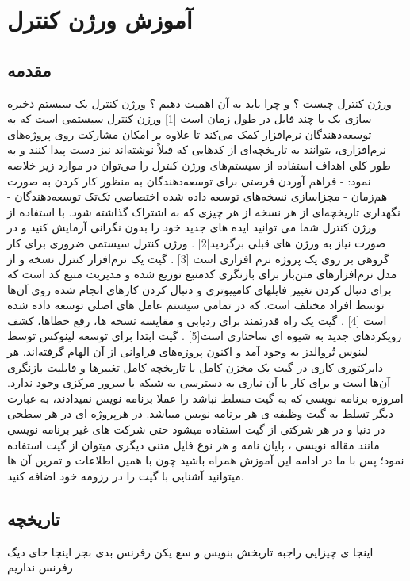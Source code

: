 \chapter{آموزش ورژن کنترل}




\section{مقدمه}
ورژن کنترل چیست ؟ و چرا باید به آن اهمیت دهیم ؟ ورژن کنترل یک سیستم ذخیره سازی یک یا چند فایل در طول زمان است [1]
ورژن کنترل سیستمی است که به توسعه‌دهندگان نرم‌افزار کمک می‌کند تا علاوه بر امکان مشارکت روی پروژه‌های نرم‌افزاری، بتوانند به تاریخچه‌ای از کدهایی که قبلاً نوشته‌اند نیز دست پیدا کنند و به طور کلی اهداف استفاده از سیستم‌های ورژن کنترل را می‌توان در موارد زیر خلاصه نمود:
- فراهم آوردن فرصتی برای توسعه‌دهندگان به منظور کار کردن به صورت هم‌زمان 
- مجزاسازی نسخه‌های توسعه داده شده اختصاصی تک‌تک توسعه‌دهندگان 
- نگهداری تاریخچه‌ای از هر نسخه از هر چیزی که به اشتراک گذاشته شود.
با استفاده از ورژن کنترل شما می توانید ایده های جدید خود را بدون نگرانی آزمایش کنید و در صورت نیاز به ورژن های قبلی برگردید[2] . ورژن کنترل سیستمی ضروری برای کار گروهی بر روی یک پروژه نرم افزاری است [3] . 
گیت یک نرم‌افزار کنترل نسخه و از مدل نرم‌افزارهای متن‌باز برای بازنگری کدمنبع توزیع شده و مدیریت منبع کد است که برای دنبال کردن تغییر فایلهای کامپیوتری و دنبال کردن کارهای انجام شده روی آن‌ها توسط افراد مختلف است. که در تمامی سیستم عامل های اصلی توسعه داده شده است [4] . گیت یک راه قدرتمند برای ردیابی و مقایسه نسخه ها، رفع خطاها، کشف رویکردهای جدید به شیوه ای ساختاری است[5] .
گیت ابتدا برای توسعه لینوکس توسط لینوس تُروالدز به وجود آمد و اکنون پروژه‌های فراوانی از آن الهام گرفته‌اند. هر دایرکتوری کاری در گیت یک مخزن کامل با تاریخچه کامل تغییرها و قابلیت بازنگری آن‌ها است و برای کار با آن نیازی به دسترسی به شبکه یا سرور مرکزی وجود ندارد.
امروزه برنامه نویسی که به گیت مسلط نباشد را عملا برنامه نویس نمیدادند، به عبارت دیگر تسلط به گیت وظیفه ی هر برنامه نویس میباشد. در هرپروژه ای در هر سطحی در دنیا و در هر شرکتی از گیت استفاده میشود حتی شرکت های غیر برنامه نویسی مانند مقاله نویسی ، پایان نامه و هر نوع فایل متنی دیگری میتوان از گیت استفاده نمود؛ پس با ما در ادامه این آموزش همراه باشید چون با همین اطلاعات و تمرین آن ها میتوانید آشنایی با گیت را در رزومه خود اضافه کنید.

\section{تاریخچه}
اینجا ی چیزایی راجبه تاریخش بنویس و سع یکن رفرنس بدی بجز اینجا جای دیگ رفرنس نداریم 
